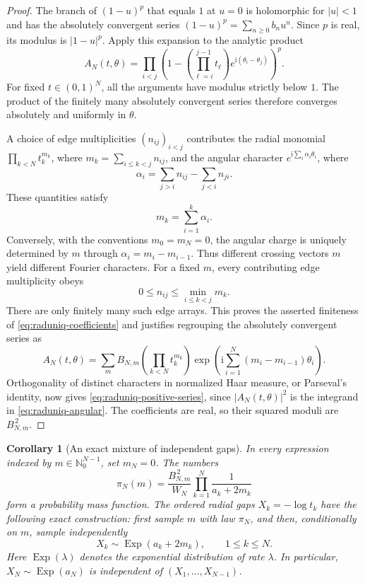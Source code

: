 \documentclass[11pt,a4paper]{article}
\numberwithin{equation}{section}
\newtheorem{corollary}[theorem]{Corollary}
\theoremstyle{definition}
\theoremstyle{remark}
\begin{document}
\begin{proof}
The branch of $(1-u)^p$ that equals $1$ at $u=0$ is holomorphic for
$|u|<1$ and has the absolutely convergent series
$(1-u)^p=\sum_{n\ge0}b_nu^n$. Since $p$ is real, its modulus is
$|1-u|^p$. Apply this expansion to the analytic product
\[
 A_N(t,\theta)=\prod_{i<j}
 \left(1-\left(\prod_{\ell=i}^{j-1}t_\ell\right)
 e^{\mathrm i(\theta_i-\theta_j)}\right)^p.
\]
For fixed $t\in(0,1)^N$, all the arguments have modulus strictly below
$1$. The product of the finitely many absolutely convergent series
therefore converges absolutely and uniformly in $\theta$.

A choice of edge multiplicities $(n_{ij})_{i<j}$ contributes the radial
monomial $\prod_{k<N}t_k^{m_k}$, where
$m_k=\sum_{i\le k<j}n_{ij}$, and the angular character
$e^{\mathrm i\sum_i\alpha_i\theta_i}$, where
\[
 \alpha_i=\sum_{j>i}n_{ij}-\sum_{j<i}n_{ji}.
\]
These quantities satisfy
\[
 m_k=\sum_{i=1}^k\alpha_i.
\]
Conversely, with the conventions $m_0=m_N=0$, the angular charge is
uniquely determined by $m$ through $\alpha_i=m_i-m_{i-1}$.
Thus different crossing vectors $m$ yield different Fourier characters.
For a fixed $m$, every contributing edge multiplicity obeys
\[
 0\le n_{ij}\le\min_{i\le k<j}m_k.
\]
There are only finitely many such edge arrays. This proves the asserted
finiteness of \eqref{eq:raduniq-coefficients} and justifies regrouping
the absolutely convergent series as
\[
 A_N(t,\theta)=
 \sum_m B_{N,m}\left(\prod_{k<N}t_k^{m_k}\right)
 \exp\left(\mathrm i\sum_{i=1}^N(m_i-m_{i-1})\theta_i\right).
\]
Orthogonality of distinct characters in normalized Haar measure, or
Parseval's identity, now gives \eqref{eq:raduniq-positive-series}, since
$|A_N(t,\theta)|^2$ is the integrand in
\eqref{eq:raduniq-angular}. The coefficients are real, so their squared
moduli are $B_{N,m}^{\,2}$.
\end{proof}

\begin{corollary}[An exact mixture of independent gaps]
\label{cor:raduniq-mixture}
In every expression indexed by $m\in\mathbb N_0^{N-1}$, set $m_N=0$.
The numbers
\begin{equation}\label{eq:raduniq-mixing-probabilities}
 \pi_N(m)=\frac{B_{N,m}^{\,2}}{W_N}
             \prod_{k=1}^N\frac1{a_k+2m_k}
\end{equation}
form a probability mass function. The ordered radial gaps
$X_k=-\log t_k$ have the following exact construction: first sample
$m$ with law $\pi_N$, and then, conditionally on $m$, sample independently
\[
 X_k\sim\operatorname{Exp}(a_k+2m_k),\qquad 1\le k\le N.
\]
Here $\operatorname{Exp}(\lambda)$ denotes the exponential distribution
of rate $\lambda$. In particular, $X_N\sim\operatorname{Exp}(a_N)$ is
independent of $(X_1,\ldots,X_{N-1})$.
\end{corollary}
\end{document}

